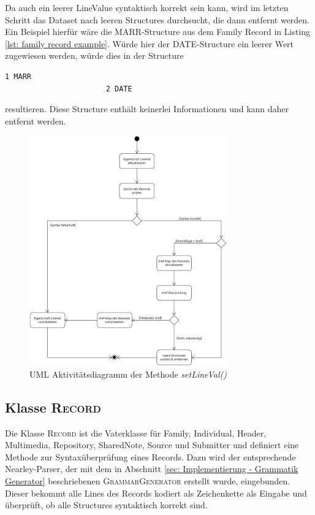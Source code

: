 Da auch ein leerer LineValue syntaktisch korrekt sein kann, wird im letzten Schritt das Dataset nach leeren Structures durchsucht, die dann entfernt werden. Ein Beispiel hierfür wäre die MARR-Structure aus dem Family Record in Listing \ref{lst: family record example}. Würde hier der DATE-Structure ein leerer Wert zugewiesen werden, würde dies in der Structure
\begin{lstlisting}[frame=none]
					   1 MARR
					   2 DATE
\end{lstlisting}
resultieren. Diese Structure enthält keinerlei Informationen und kann daher entfernt werden.
 
\begin{figure}[h]
	\centering
	\includegraphics[width=0.76\textwidth]{images/UML_Activity_SetLineVal.png}
	\caption{UML Aktivitätsdiagramm der Methode \textit{setLineVal()}}
	\label{fig: UML Aktivität setLineVal}
\end{figure}


\subsection{Klasse \textsc{Record}}
\label{subsec: Implementierung - Gedcom Struktur - Klasse Record}
Die Klasse \textsc{Record} ist die Vaterklasse für Family, Individual, Header, Multimedia, Repository, SharedNote, Source und Submitter und definiert eine Methode zur Syntaxüberprüfung eines Records. Dazu wird der entsprechende Nearley-Parser, der mit dem in Abschnitt \ref{sec: Implementierung - Grammatik Generator} beschriebenen \textsc{GrammarGenerator} erstellt wurde, eingebunden. Dieser bekommt alle Lines des Records kodiert als Zeichenkette als Eingabe und überprüft, ob alle Structures syntaktisch korrekt sind.



